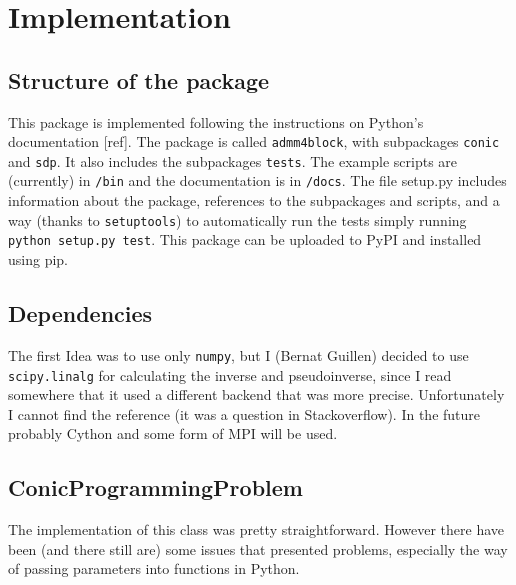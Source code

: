 \documentclass[paper=a4, fontsize=11pt]{scrartcl}
\numberwithin{equation}{section}		%
\numberwithin{figure}{section}			%
\numberwithin{table}{section}				%
\begin{document}
\section{Implementation}
\subsection{Structure of the package}
This package is implemented following the instructions on Python's documentation [ref]. The package is called \texttt{admm4block}, with subpackages \texttt{conic} and \texttt{sdp}. It also includes the subpackages \texttt{tests}. The example scripts are (currently) in \texttt{/bin} and the documentation is in \texttt{/docs}. The file setup.py includes information about the package, references to the subpackages and scripts, and a way (thanks to \texttt{setuptools}) to automatically run the tests simply running \texttt{python setup.py test}. This package can be uploaded to PyPI and installed using pip.
\subsection{Dependencies}
The first Idea was to use only \texttt{numpy}, but I (Bernat Guillen) decided to use \texttt{scipy.linalg} for calculating the inverse and pseudoinverse, since I read somewhere that it used a different backend that was more precise. Unfortunately I cannot find the reference (it was a question in Stackoverflow). In the future probably Cython and some form of MPI will be used.
\subsection{ConicProgrammingProblem}
The implementation of this class was pretty straightforward. However there have been (and there still are) some issues that presented problems, especially the way of passing parameters into functions in Python. 
\end{document}
